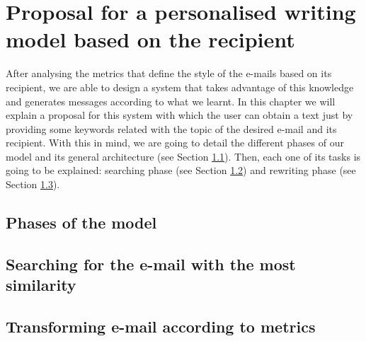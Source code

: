 \chapter{Proposal for a personalised writing model based on the recipient}\label{cap:proposal}


After analysing the metrics that define the style of the e-mails based on its recipient, we are able to design a system that takes advantage of this knowledge and generates messages according to what we learnt. In this chapter we will explain a proposal for this system with which the user can obtain a text just by providing some keywords related with the topic of the desired e-mail and its recipient. With this in mind, we are going to detail the different phases of our model and its general architecture (see Section \ref{sect:phasemod}). Then, each one of its tasks is going to be explained: searching phase (see Section \ref{sect:searchemail}) and rewriting phase (see Section \ref{sect:transemail}).

\section{Phases of the model}\label{sect:phasemod}


\section{Searching for the e-mail with the most similarity}\label{sect:searchemail}


\section{Transforming e-mail according to metrics}\label{sect:transemail}
